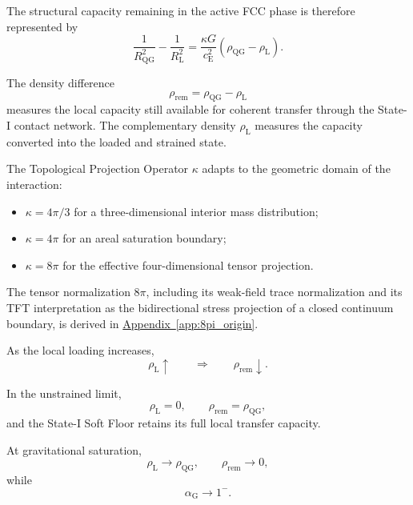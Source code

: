 The structural capacity remaining in the active FCC phase is therefore represented by
\begin{equation}
    \frac{1}{R_{\mathrm{QG}}^2} - \frac{1}{R_{\mathrm{L}}^2} = \frac{\kappa G}{c_{\mathrm{E}}^2} \left( \rho_{\mathrm{QG}} - \rho_{\mathrm{L}} \right).
\end{equation}

The density difference
\begin{equation}
    \rho_{\mathrm{rem}} = \rho_{\mathrm{QG}} - \rho_{\mathrm{L}}
\end{equation}
measures the local capacity still available for coherent transfer through the State-I contact network. The complementary density $\rho_{\mathrm{L}}$ measures the capacity converted into the loaded and strained state.

The Topological Projection Operator $\kappa$ adapts to the geometric domain of the interaction:
\begin{itemize}
    \item $\kappa=4\pi/3$ for a three-dimensional interior mass distribution;
    \item $\kappa=4\pi$ for an areal saturation boundary;
    \item $\kappa=8\pi$ for the effective four-dimensional tensor projection.
\end{itemize}

The tensor normalization $8\pi$, including its weak-field trace normalization and its TFT interpretation as the bidirectional stress projection of a closed continuum boundary, is derived in \hyperref[app:8pi_origin]{Appendix~\ref*{app:8pi_origin}}.

As the local loading increases,
\begin{equation}
    \rho_{\mathrm{L}}\uparrow \qquad\Longrightarrow\qquad \rho_{\mathrm{rem}}\downarrow.
\end{equation}

In the unstrained limit,
\begin{equation}
    \rho_{\mathrm{L}}=0, \qquad \rho_{\mathrm{rem}}=\rho_{\mathrm{QG}},
\end{equation}
and the State-I Soft Floor retains its full local transfer capacity.

At gravitational saturation,
\begin{equation}
    \rho_{\mathrm{L}}\rightarrow\rho_{\mathrm{QG}}, \qquad \rho_{\mathrm{rem}}\rightarrow0,
\end{equation}
while
\begin{equation}
    \alpha_{\mathrm{G}}\rightarrow1^{-}.
\end{equation}

